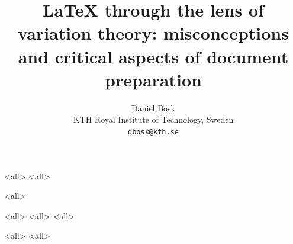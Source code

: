 \documentclass[ignoreframetext]{beamer}
\begin{document}
\title{%
  LaTeX through the lens of variation theory:
  misconceptions and critical aspects of document preparation%
}
\author{%
  Daniel Bosk
  \\KTH Royal Institute of Technology, Sweden
  \\\texttt{dbosk@kth.se}
}

\mode*

\begin{frame}
  \maketitle
\end{frame}

\begin{abstract}
  
\end{abstract}

\begin{frame}
  \tableofcontents[subsectionstyle=hide,subsubsectionstyle=hide]
\end{frame}

\mode<all>{}
\mode<all>{}

\mode<all>{}

\mode<all>{}
\mode<all>{}
\mode<all>{}

\mode<all>{}
\mode<all>{}

\begin{frame}[allowframebreaks]
\printbibliography
\end{frame}
\end{document}
